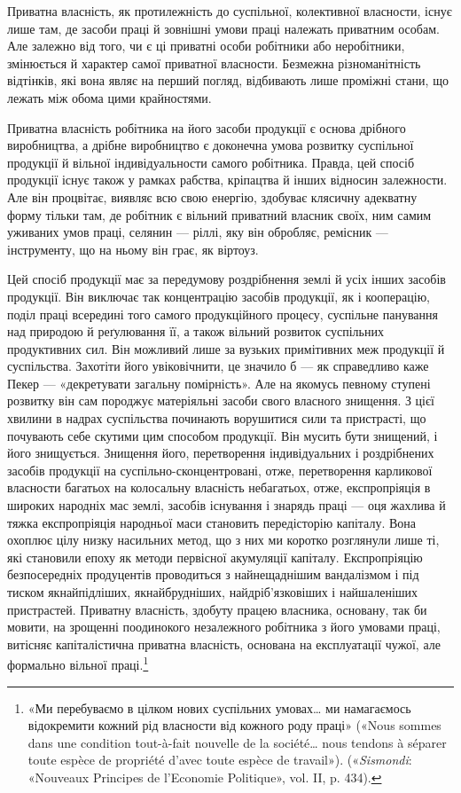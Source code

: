 Приватна власність, як протилежність до суспільної, колективної
власности, існує лише там, де засоби праці й зовнішні
умови праці належать приватним особам. Але залежно від того,
чи є ці приватні особи робітники або неробітники, змінюється
й характер самої приватної власности. Безмежна різноманітність
відтінків, які вона являє на перший погляд, відбивають лише
проміжні стани, що лежать між обома цими крайностями.

Приватна власність робітника на його засоби продукції є
основа дрібного виробництва, а дрібне виробництво є доконечна
умова розвитку суспільної продукції й вільної індивідуальности
самого робітника. Правда, цей спосіб продукції існує також у
рамках рабства, кріпацтва й інших відносин залежности. Але
він процвітає, виявляє всю свою енергію, здобуває клясичну
адекватну форму тільки там, де робітник є вільний приватний
власник своїх, ним самим уживаних умов праці, селянин — ріллі,
яку він обробляє, ремісник — інструменту, що на ньому він грає,
як віртоуз.

Цей спосіб продукції має за передумову роздрібнення землі
й усіх інших засобів продукції. Він виключає так концентрацію
засобів продукції, як і кооперацію, поділ праці всередині того
самого продукційного процесу, суспільне панування над природою
й реґулювання її, а також вільний розвиток суспільних продуктивних
сил. Він можливий лише за вузьких примітивних
меж продукції й суспільства. Захотіти його увіковічнити, це
значило б — як справедливо каже Пекер — «декретувати
загальну помірність». Але на якомусь певному ступені розвитку
він сам породжує матеріяльні засоби свого власного знищення.
З цієї хвилини в надрах суспільства починають ворушитися
сили та пристрасті, що почувають себе скутими цим способом
продукції. Він мусить бути знищений, і його знищується. Знищення
його, перетворення індивідуальних і роздрібнених засобів
продукції на суспільно-сконцентровані, отже, перетворення
карликової власности багатьох на колосальну власність
небагатьох, отже, експропріяція в широких народніх мас землі,
засобів існування і знарядь праці — оця жахлива й тяжка
експропріяція народньої маси становить передісторію капіталу.
Вона охоплює цілу низку насильних метод, що з них ми коротко
розглянули лише ті, які становили епоху як методи первісної
акумуляції капіталу. Експропріяцію безпосередніх продуцентів
проводиться з найнещаднішим вандалізмом і під тиском
якнайпідліших, якнайбрудніших, найдріб’язковіших і найшаленіших
пристрастей. Приватну власність, здобуту працею власника,
основану, так би мовити, на зрощенні поодинокого незалежного
робітника з його умовами праці, витісняє капіталістична
приватна власність, основана на експлуатації чужої, але формально
вільної праці.\footnote{
«Ми перебуваємо в цілком нових суспільних умовах\dots{} ми намагаємось
відокремити кожний рід власности від кожного роду праці»
(«Nous sommes dans une condition tout-à-fait nouvelle de la société\dots{}
nous tendons à séparer toute espèce de propriété d’avec toute espèce de
travail»). («\emph{Sismondi}: «Nouveaux Principes de l’Economie Politique»,
vol. II, p. 434).
}

